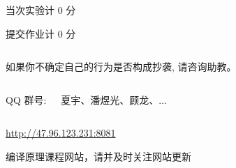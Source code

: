 \begin{frame}
  \begin{center}
  \end{center}

  \pause
  \begin{columns}
    \begin{description}
      \setlength{\itemsep}{6pt}
      \item[实验:] 当次实验计 $0$ 分
      \item[附加作业:] 提交作业计 $0$ 分
    \end{description}
  \end{columns}
\end{frame}

\begin{frame}
  \begin{center}

    \vspace{0.50cm}
    如果你不确定自己的行为是否构成抄袭, 请咨询助教。
  \end{center}
\end{frame}

\begin{frame}{}
  \begin{columns}
    \begin{center}
      QQ 群号: 

    \end{center}
    \begin{center}
      {\bf {}} 夏宇、潘煜光、顾龙、$\dots$
    \end{center}
  \end{columns}
\end{frame}

\begin{frame}{}
  \begin{center}
    \url{http://47.96.123.231:8081} \\[5pt]


    编译原理课程网站，请并及时关注网站更新
  \end{center}
\end{frame}

